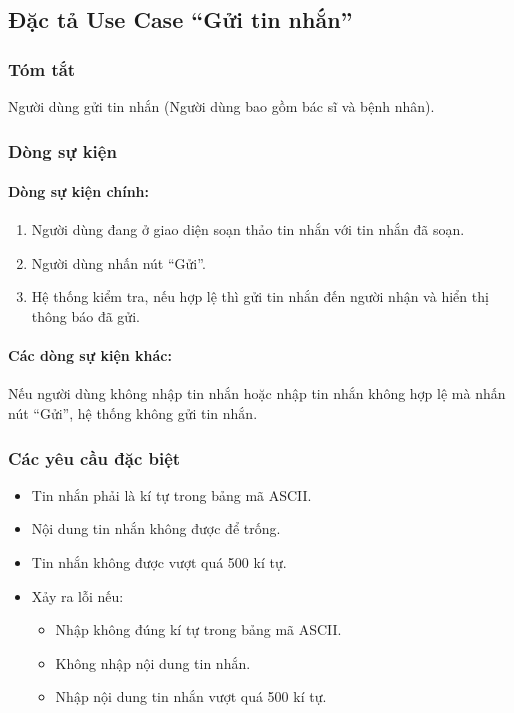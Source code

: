 \subsection{Đặc tả Use Case ``Gửi tin nhắn''}

\subsubsection{Tóm tắt}
Người dùng gửi tin nhắn (Người dùng bao gồm bác sĩ và bệnh nhân).

\subsubsection{Dòng sự kiện}
\paragraph{\textbf{Dòng sự kiện chính:}}
\begin{enumerate}
  \item Người dùng đang ở giao diện soạn thảo tin nhắn với tin nhắn đã soạn.
  \item Người dùng nhấn nút ``Gửi''.
  \item Hệ thống kiểm tra, nếu hợp lệ thì gửi tin nhắn đến người nhận và hiển thị thông báo đã gửi.
\end{enumerate}

\paragraph{\textbf{Các dòng sự kiện khác:}}
Nếu người dùng không nhập tin nhắn hoặc nhập tin nhắn không hợp lệ mà nhấn nút ``Gửi'', hệ thống không gửi tin nhắn.

\subsubsection{Các yêu cầu đặc biệt}
\begin{itemize}
  \item Tin nhắn phải là kí tự trong bảng mã ASCII.
  \item Nội dung tin nhắn không được để trống.
  \item Tin nhắn không được vượt quá 500 kí tự.
  \item Xảy ra lỗi nếu:
    \begin{itemize}
      \item Nhập không đúng kí tự trong bảng mã ASCII.
      \item Không nhập nội dung tin nhắn.
      \item Nhập nội dung tin nhắn vượt quá 500 kí tự.
    \end{itemize}
\end{itemize}

